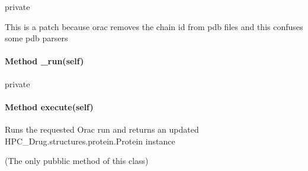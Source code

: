             private

            This is a patch because orac removes the chain id from
            pdb files and this confuses some pdb parsers


        \paragraph{Method \_run(self)}
        
            private

        \paragraph{Method execute(self)}
        
            Runs the requested Orac run and returns an updated 
            HPC\_Drug.structures.protein.Protein instance

            (The only pubblic method of this class)